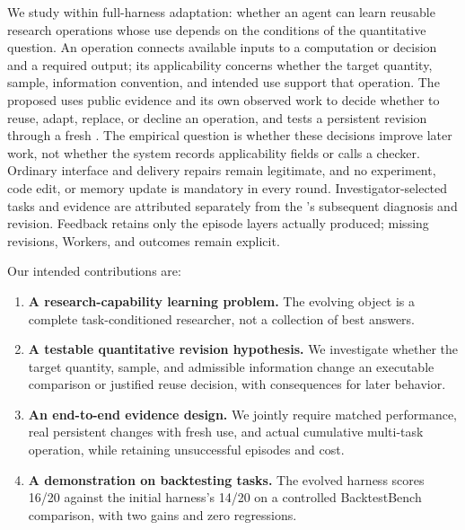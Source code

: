 We study \method{} within full-harness adaptation: whether an agent can learn
reusable research operations whose use depends on the conditions of the
quantitative question. An operation connects available inputs to a computation
or decision and a required output; its applicability concerns whether the target
quantity, sample, information convention, and intended use support that operation.
The proposed \Evolver{} uses public evidence and its own observed work to decide
whether to reuse, adapt, replace, or decline an operation, and tests a persistent
revision through a fresh \Worker{}. The empirical question is whether these
decisions improve later work, not whether the system records applicability
fields or calls a checker. Ordinary interface and delivery repairs remain
legitimate, and no experiment, code edit, or memory update is mandatory in every
round. Investigator-selected tasks and evidence are attributed separately from
the \Evolver{}'s subsequent diagnosis and revision. Feedback retains only the
episode layers actually produced; missing revisions, Workers, and outcomes
remain explicit.

Our intended contributions are:

\begin{enumerate}
  \item \textbf{A research-capability learning problem.}  The evolving object
  is a complete task-conditioned researcher, not a collection of best answers.
  \item \textbf{A testable quantitative revision hypothesis.} We investigate
  whether the target quantity, sample, and admissible information change an
  executable comparison or justified reuse decision, with consequences for
  later \Worker{} behavior.
  \item \textbf{An end-to-end evidence design.}  We jointly require matched
  performance, real persistent changes with fresh \Worker{} use, and actual
  cumulative multi-task operation, while retaining unsuccessful episodes and
  cost.
  \item \textbf{A demonstration on backtesting tasks.}  The evolved harness
  scores 16/20 against the initial harness's 14/20 on a controlled
  BacktestBench comparison, with two gains and zero regressions.
\end{enumerate}


